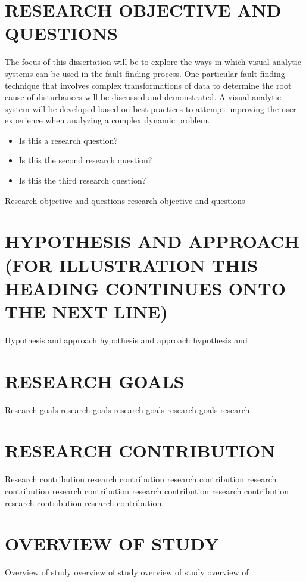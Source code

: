 \section{RESEARCH OBJECTIVE AND QUESTIONS}

The focus of this dissertation will be to explore the ways in which visual analytic systems can be used in the fault finding process. One particular fault finding technique that involves complex transformations of data to determine the root cause of disturbances will be discussed and demonstrated. A visual analytic system will be developed based on best practices to attempt improving the user experience when analyzing a complex dynamic problem.

\begin{itemize}
\item Is this a research question?
\item Is this the second research question?
\item Is this the third research question?
\end{itemize}

Research objective and questions research objective and questions

\section{HYPOTHESIS AND APPROACH (FOR ILLUSTRATION THIS HEADING
  CONTINUES ONTO THE NEXT LINE)}

Hypothesis and approach hypothesis and approach hypothesis and

\section{RESEARCH GOALS}

Research goals research goals research goals research goals research

\section{RESEARCH CONTRIBUTION}

Research contribution research contribution research contribution
research contribution research contribution research contribution
research contribution research contribution research contribution.

\section{OVERVIEW OF STUDY}

Overview of study overview of study overview of study overview of

